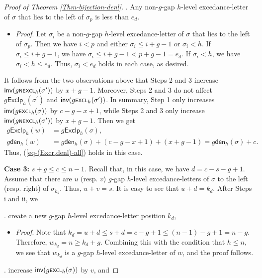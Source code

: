 \documentclass[12pt]{article}
\begin{document}
\begin{proof}[Proof of Theorem \ref{Thm-bijection-denl}]
. Any non-$g$-gap $h$-level excedance-letter of $\sigma$ that lies  to the left of $\sigma_{p}$ is less than $e_{d}$.
\begin{itemize}[leftmargin=1.6em]
	\item[]\emph{Proof}. 
	Let $\sigma_{i}$ be a non-$g$-gap $h$-level excedance-letter of $\sigma$ that lies to the left of $\sigma_{p}$.
	Then we have $i<p$ and either $\sigma_{i}\leq i+g-1$ or $\sigma_{i}<h$.
	If $\sigma_{i}\leq i+g-1$, we have $\sigma_{i}\leq i+g-1<p+g-1=e_{d}$.
	If $\sigma_{i}<h$, we have $\sigma_{i}<h\leq e_{d}$.
	Thus, $\sigma_{i}<e_{d}$ holds in each case, as desired.
\end{itemize}
It follows from the two observations above that Steps 2 and 3 increase $\textsf{inv}(g\textsf{\scriptsize{NEXCL}}_{h}(\sigma^{\prime}))$ by $x+g-1$.
Moreover, Steps 2 and 3 do not affect $g\textsf{Exclp}_{h}(\sigma^{\prime})$ and $\textsf{inv}(g\textsf{\scriptsize{EXCL}}_{h}(\sigma^{\prime}))$.
In summary,
Step 1 only increases $\textsf{inv}(g\textsf{\scriptsize{EXCL}}_{h}(\sigma))$ by $c-g-x+1$, while Steps 2 and 3 only increase $\textsf{inv}(g\textsf{\scriptsize{NEXCL}}_{h}(\sigma^{\prime}))$ by $x+g-1$.
Then we get
\begin{align*}
	g\textsf{Exclp}_{h}(w)&=g\textsf{Exclp}_{h}(\sigma), \\
	g\textsf{den}_{h}(w)&=g\textsf{den}_{h}(\sigma)+(c-g-x+1)+(x+g-1)
	=g\textsf{den}_{h}(\sigma)+c.
\end{align*}
Thus, (\ref{eq-(Excr,denl)-all}) holds in this case.

\noindent \textbf{Case 3:} $s+g\leq c\leq n-1$. 
Recall that, in this case, we have $d=c-s-g+1$.
Assume that there are $u$ (resp. $v$) $g$-gap $h$-level excedance-letters of $\sigma$ to the left (resp. right) of  $\sigma_{k_{d}}$.
Thus, $u+v=s$.
It is easy to see that $u+d=k_{d}$.
After Steps i and ii, we 

. create a new $g$-gap $h$-level excedance-letter position  $k_{d}$, 
\begin{itemize}[leftmargin=1.6em]
	\item[]\emph{Proof}. 
Note that $k_{d}=u+d\leq s+d=c-g+1\leq (n-1)-g+1=n-g$.
Therefore, $w_{k_{d}}=n\geq k_{d}+g$. 
Combining this with the condition that $h\leq n$,
we see that $w_{k_{d}}$ is a $g$-gap $h$-level excedance-letter of $w$,
and the proof follows.
\end{itemize}

. increase $\textsf{inv}(g\textsf{\scriptsize{EXCL}}_{h}(\sigma))$ by $v$, and


\end{proof}
\end{document}
